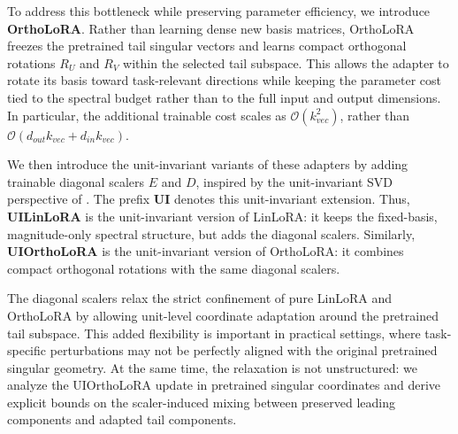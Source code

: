 To address this bottleneck while preserving parameter efficiency, we introduce \textbf{OrthoLoRA}. Rather than learning dense new basis matrices, OrthoLoRA freezes the pretrained tail singular vectors and learns compact orthogonal rotations \(R_U\) and \(R_V\) within the selected tail subspace. This allows the adapter to rotate its basis toward task-relevant directions while keeping the parameter cost tied to the spectral budget rather than to the full input and output dimensions. In particular, the additional trainable cost scales as \(\mathcal{O}(k_{vec}^2)\), rather than \(\mathcal{O}(d_{out}k_{vec}+d_{in}k_{vec})\).

We then introduce the unit-invariant variants of these adapters by adding trainable diagonal scalers \(E\) and \(D\), inspired by the unit-invariant SVD perspective of \citet{uhlmann2018generalized}. The prefix \textbf{UI} denotes this unit-invariant extension. Thus, \textbf{UILinLoRA} is the unit-invariant version of LinLoRA: it keeps the fixed-basis, magnitude-only spectral structure, but adds the diagonal scalers. Similarly, \textbf{UIOrthoLoRA} is the unit-invariant version of OrthoLoRA: it combines compact orthogonal rotations with the same diagonal scalers.

The diagonal scalers relax the strict confinement of pure LinLoRA and OrthoLoRA by allowing unit-level coordinate adaptation around the pretrained tail subspace. This added flexibility is important in practical settings, where task-specific perturbations may not be perfectly aligned with the original pretrained singular geometry. At the same time, the relaxation is not unstructured: we analyze the UIOrthoLoRA update in pretrained singular coordinates and derive explicit bounds on the scaler-induced mixing between preserved leading components and adapted tail components.

